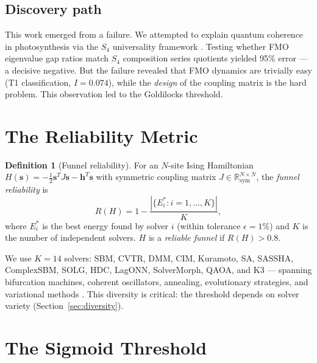 \documentclass[11pt]{amsart}
\theoremstyle{definition}
\newtheorem{definition}[theorem]{Definition}
\begin{document}
\subsection{Discovery path}

This work emerged from a failure. We attempted to explain quantum coherence in photosynthesis via the $S_4$ universality framework \cite{novel2026}. Testing whether FMO eigenvalue gap ratios match $S_4$ composition series quotients yielded 95\% error --- a decisive negative. But the failure revealed that FMO dynamics are trivially easy (T1 classification, $I = 0.074$), while the \emph{design} of the coupling matrix is the hard problem. This observation led to the Goldilocks threshold.


\section{The Reliability Metric}
\label{sec:metric}

\begin{definition}[Funnel reliability]\label{def:funnel}
For an $N$-site Ising Hamiltonian $H(\mathbf{s}) = -\frac{1}{2}\mathbf{s}^T J \mathbf{s} - \mathbf{h}^T \mathbf{s}$ with symmetric coupling matrix $J \in \mathbb{R}^{N \times N}_{\mathrm{sym}}$, the \emph{funnel reliability} is
\[
R(H) = 1 - \frac{|\{E_i^* : i = 1, \ldots, K\}|}{K},
\]
where $E_i^*$ is the best energy found by solver $i$ (within tolerance $\epsilon = 1\%$) and $K$ is the number of independent solvers. $H$ is a \emph{reliable funnel} if $R(H) > 0.8$.
\end{definition}

We use $K = 14$ solvers: SBM, CVTR, DMM, CIM, Kuramoto, SA, SASSHA, ComplexSBM, SOLG, HDC, LagONN, SolverMorph, QAOA, and K3 --- spanning bifurcation machines, coherent oscillators, annealing, evolutionary strategies, and variational methods \cite{dsc3engine}. This diversity is critical: the threshold depends on solver variety (Section~\ref{sec:diversity}).


\section{The Sigmoid Threshold}
\label{sec:sigmoid}
\end{document}

